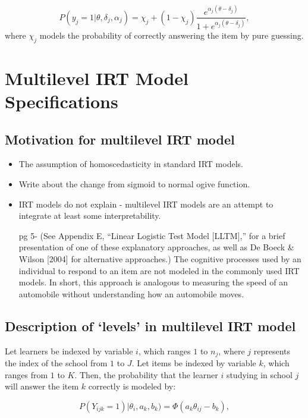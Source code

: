 \documentclass[12pt]{article}
\begin{document}
\begin{equation}\label{eq:3pl}
    P(y_j=1|\theta, \delta_j, \alpha_j) = \chi_j + (1 - \chi_j) \frac{e^{\alpha_j(\theta - \delta_j)}}{1+e^{\alpha_j(\theta - \delta_j)}},
\end{equation}
where $\chi_j$ models the probability of correctly answering the item by pure guessing.


\section{Multilevel IRT Model Specifications}
\subsection{Motivation for multilevel IRT model}
\begin{itemize}
    \item The assumption of homoscedasticity in standard IRT models.
    \item Write about the change from sigmoid to normal ogive function.
    \item IRT models do not explain - multilevel IRT models are an attempt to integrate at least some interpretability.
    
    pg 5- (See Appendix E, “Linear Logistic Test Model [LLTM],” for a brief presentation of one of these explanatory approaches, as well as De Boeck \& Wilson [2004] for alternative approaches.) The cognitive processes used by an individual to respond to an item are not modeled in the commonly used IRT models. In short, this approach is analogous to measuring the speed of an automobile without understanding how an automobile moves. \cite{de2013theory}
\end{itemize}

\subsection{Description of `levels' in multilevel IRT model}

Let learners be indexed by variable $i$, which ranges $1$ to $n_j$, where $j$ represents the index of the school from $1$ to $J$. Let items be indexed by variable $k$, which ranges from $1$ to $K$. Then, the probability that the learner $i$ studying in school $j$ will answer the item $k$ correctly is modeled by:

\begin{equation}\label{first_level}
    P(Y_{ijk}=1) | \theta_i, a_k, b_k) = \Phi(a_k \theta_{ij} - b_k),
\end{equation}
\end{document}
